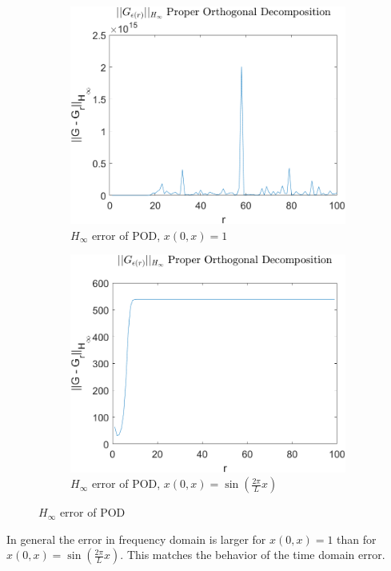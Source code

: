 \begin{figure}[H]
\begin{subfigure}[b]{0.5\textwidth}
\centering
\includegraphics[width=\textwidth]{images/freq/H_POD}
\caption{$H_{\infty}$ error of POD, $x(0, x) = 1$}
\label{FIG-H-POD}
\end{subfigure}
\begin{subfigure}[b]{0.5\textwidth}
\centering
\includegraphics[width=\textwidth]{images/freq/H_POD_SIN}
\caption{$H_{\infty}$ error of POD, $x(0, x) =  \sin(\frac{2\pi}{L}x)$}
\label{FIG-H-POD-SIN}
\end{subfigure}
\caption{$H_{\infty}$ error of POD}
\label{FIG-H-POD-1}
\end{figure}
In general the error in frequency domain is larger for \(x(0, x) = 1\) than for \(x(0, x) =  \sin(\frac{2\pi}{L}x)\). 
This matches the behavior of the time domain error.

